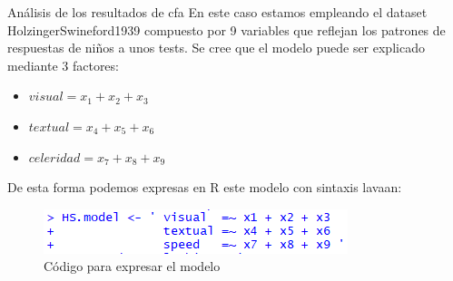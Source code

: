 \documentclass[10pt]{beamer}
\begin{document}
\begin{frame}[fragile]{Análisis de los resultados de cfa}
En este caso estamos empleando el dataset HolzingerSwineford1939 compuesto por 9 variables que reflejan los patrones de respuestas de niños a unos tests. Se cree que el modelo puede ser explicado mediante 3 factores:
\begin{itemize}
	\item $visual = x_1 + x_2 + x_3$
	\item $textual = x_4 + x_5 + x_6$
	\item $celeridad = x_7 + x_8 + x_9$
\end{itemize}
De esta forma podemos expresas en R este modelo con sintaxis lavaan:
\begin{figure}
	\includegraphics[scale=1]{./Imagenes/res_cfa1.png}
	\caption{Código para expresar el modelo}
\end{figure}
\end{frame}
\end{document}
